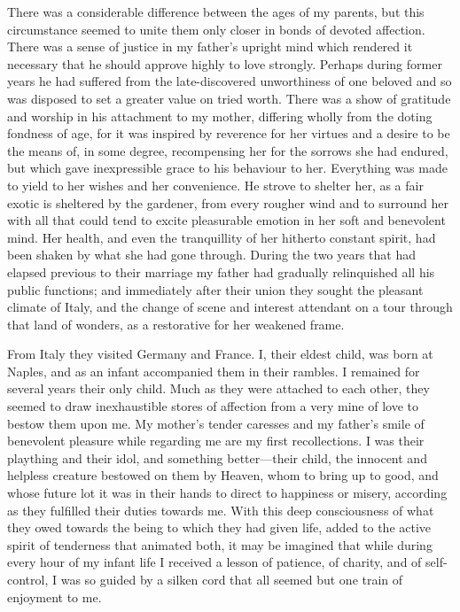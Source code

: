 \documentclass[12pt,openright]{book}
\begin{document}
There was a considerable difference between the ages of my parents, but this circumstance seemed to unite them only closer in bonds of devoted affection. There was a sense of justice in my father’s upright mind which rendered it necessary that he should approve highly to love strongly. Perhaps during former years he had suffered from the late-discovered unworthiness of one beloved and so was disposed to set a greater value on tried worth. There was a show of gratitude and worship in his attachment to my mother, differing wholly from the doting fondness of age, for it was inspired by reverence for her virtues and a desire to be the means of, in some degree, recompensing her for the sorrows she had endured, but which gave inexpressible grace to his behaviour to her. Everything was made to yield to her wishes and her convenience. He strove to shelter her, as a fair exotic is sheltered by the gardener, from every rougher wind and to surround her with all that could tend to excite pleasurable emotion in her soft and benevolent mind. Her health, and even the tranquillity of her hitherto constant spirit, had been shaken by what she had gone through. During the two years that had elapsed previous to their marriage my father had gradually relinquished all his public functions; and immediately after their union they sought the pleasant climate of Italy, and the change of scene and interest attendant on a tour through that land of wonders, as a restorative for her weakened frame.

From Italy they visited Germany and France. I, their eldest child, was born at Naples, and as an infant accompanied them in their rambles. I remained for several years their only child. Much as they were attached to each other, they seemed to draw inexhaustible stores of affection from a very mine of love to bestow them upon me. My mother’s tender caresses and my father’s smile of benevolent pleasure while regarding me are my first recollections. I was their plaything and their idol, and something better—their child, the innocent and helpless creature bestowed on them by Heaven, whom to bring up to good, and whose future lot it was in their hands to direct to happiness or misery, according as they fulfilled their duties towards me. With this deep consciousness of what they owed towards the being to which they had given life, added to the active spirit of tenderness that animated both, it may be imagined that while during every hour of my infant life I received a lesson of patience, of charity, and of self-control, I was so guided by a silken cord that all seemed but one train of enjoyment to me.
\end{document}
